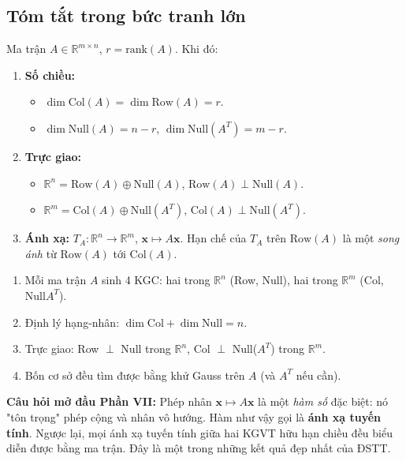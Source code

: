 \documentclass[12pt,a4paper]{article}
\begin{document}
\subsection{Tóm tắt trong bức tranh lớn}

\begin{ynghia}[title={Định lý cơ bản của Đại số tuyến tính}]
Ma trận $A \in \mathbb{R}^{m\times n}$, $r = \mathrm{rank}(A)$. Khi đó:
\begin{enumerate}
  \item \textbf{Số chiều:}
  \begin{itemize}
    \item $\dim \mathrm{Col}(A) = \dim \mathrm{Row}(A) = r$.
    \item $\dim \mathrm{Null}(A) = n - r$, $\dim \mathrm{Null}(A^T) = m - r$.
  \end{itemize}
  \item \textbf{Trực giao:}
  \begin{itemize}
    \item $\mathbb{R}^n = \mathrm{Row}(A) \oplus \mathrm{Null}(A)$, $\mathrm{Row}(A) \perp \mathrm{Null}(A)$.
    \item $\mathbb{R}^m = \mathrm{Col}(A) \oplus \mathrm{Null}(A^T)$, $\mathrm{Col}(A) \perp \mathrm{Null}(A^T)$.
  \end{itemize}
  \item \textbf{Ánh xạ:} $T_A: \mathbb{R}^n \to \mathbb{R}^m$, $\mathbf{x} \mapsto A\mathbf{x}$. Hạn chế của $T_A$ trên $\mathrm{Row}(A)$ là một \emph{song ánh} từ $\mathrm{Row}(A)$ tới $\mathrm{Col}(A)$.
\end{enumerate}
\end{ynghia}

\begin{tongket}[title={Tổng kết Phần VI}]
\begin{enumerate}
  \item Mỗi ma trận $A$ sinh 4 KGC: hai trong $\mathbb{R}^n$ (Row, Null), hai trong $\mathbb{R}^m$ (Col, Null$A^T$).
  \item Định lý hạng-nhân: $\dim\mathrm{Col} + \dim\mathrm{Null} = n$.
  \item Trực giao: Row $\perp$ Null trong $\mathbb{R}^n$, Col $\perp$ Null($A^T$) trong $\mathbb{R}^m$.
  \item Bốn cơ sở đều tìm được bằng khử Gauss trên $A$ (và $A^T$ nếu cần).
\end{enumerate}

\textbf{Câu hỏi mở đầu Phần VII:} Phép nhân $\mathbf{x} \mapsto A\mathbf{x}$ là một \emph{hàm số} đặc biệt: nó "tôn trọng" phép cộng và nhân vô hướng. Hàm như vậy gọi là \textbf{ánh xạ tuyến tính}. Ngược lại, mọi ánh xạ tuyến tính giữa hai KGVT hữu hạn chiều đều biểu diễn được bằng ma trận. Đây là một trong những kết quả đẹp nhất của ĐSTT.
\end{tongket}
\end{document}
